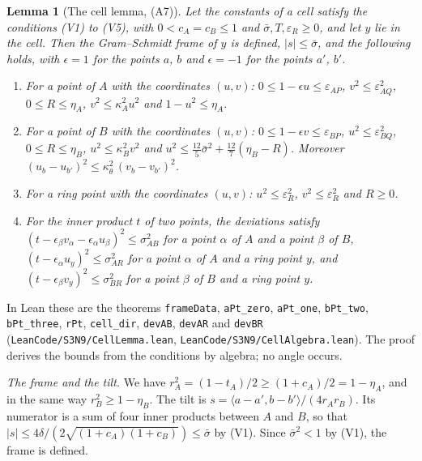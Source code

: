 \documentclass[reqno,a4paper,11pt]{amsart}
\numberwithin{equation}{section}
\newtheorem{lemma}[theorem]{Lemma}
\newcommand{\lean}[1]{\texttt{#1}}
\newcommand{\file}[1]{\nolinkurl{#1}}
\begin{document}
\begin{lemma}[The cell lemma, (A7)]\label{lma:gscell}
Let the constants of a cell satisfy the conditions \textup{(V1)} to \textup{(V5)}, with $0 < c_A = c_B \leq 1$ and $\bar\sigma, T, \varepsilon_R \geq 0$, and let $y$ lie in the cell. Then the Gram--Schmidt frame of $y$ is defined, $|s| \leq \bar\sigma$, and the following holds, with $\epsilon = 1$ for the points $a$, $b$ and $\epsilon = -1$ for the points $a'$, $b'$.
\begin{enumerate}
    \item[(i)] For a point of $A$ with the coordinates $(u, v)$: $0 \leq 1 - \epsilon u \leq \varepsilon_{AP}$, $v^2 \leq \varepsilon_{AQ}^2$, $0 \leq R \leq \eta_A$, $v^2 \leq \kappa_A^2 u^2$ and $1 - u^2 \leq \eta_A$.
    \item[(ii)] For a point of $B$ with the coordinates $(u, v)$: $0 \leq 1 - \epsilon v \leq \varepsilon_{BP}$, $u^2 \leq \varepsilon_{BQ}^2$, $0 \leq R \leq \eta_B$, $u^2 \leq \kappa_B^2 v^2$ and $u^2 \leq \tfrac{12}{5} \bar\sigma^2 + \tfrac{12}{7} (\eta_B - R)$. Moreover $(u_b - u_{b'})^2 \leq \kappa_\theta^2 \, (v_b - v_{b'})^2$.
    \item[(iii)] For a ring point with the coordinates $(u, v)$: $u^2 \leq \varepsilon_R^2$, $v^2 \leq \varepsilon_R^2$ and $R \geq 0$.
    \item[(iv)] For the inner product $t$ of two points, the deviations satisfy $(t - \epsilon_\beta v_\alpha - \epsilon_\alpha u_\beta)^2 \leq \sigma_{AB}^2$ for a point $\alpha$ of $A$ and a point $\beta$ of $B$, $(t - \epsilon_\alpha u_y)^2 \leq \sigma_{AR}^2$ for a point $\alpha$ of $A$ and a ring point $y$, and $(t - \epsilon_\beta v_y)^2 \leq \sigma_{BR}^2$ for a point $\beta$ of $B$ and a ring point $y$.
\end{enumerate}
\end{lemma}

In Lean these are the theorems \lean{frameData}, \lean{aPt\_zero}, \lean{aPt\_one}, \lean{bPt\_two}, \lean{bPt\_three}, \lean{rPt}, \lean{cell\_dir}, \lean{devAB}, \lean{devAR} and \lean{devBR} (\file{LeanCode/S3N9/CellLemma.lean}, \file{LeanCode/S3N9/CellAlgebra.lean}). The proof derives the bounds from the conditions by algebra; no angle occurs.

\emph{The frame and the tilt.} We have $r_A^2 = (1 - t_A)/2 \geq (1 + c_A)/2 = 1 - \eta_A$, and in the same way $r_B^2 \geq 1 - \eta_B$. The tilt is $s = \langle a - a', b - b' \rangle / (4 r_A r_B)$. Its numerator is a sum of four inner products between $A$ and $B$, so that $|s| \leq 4 \delta / (2 \sqrt{(1 + c_A)(1 + c_B)}) \leq \bar\sigma$ by (V1). Since $\bar\sigma^2 < 1$ by (V1), the frame is defined.
\end{document}
